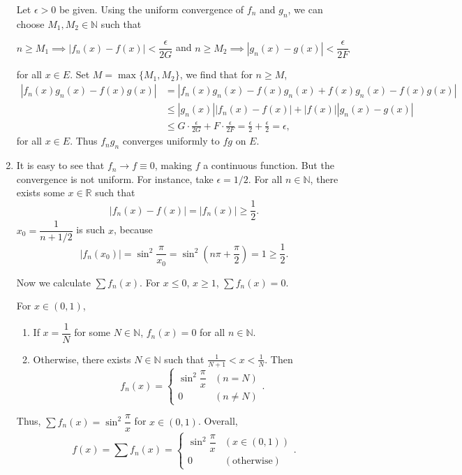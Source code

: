 \documentclass[12pt]{report}
\newcommand{\numl}[1]{\item[\large\textbf{\sffamily #1.}]}
\newcommand{\ds}{\displaystyle}
\newcommand{\abs}[1]{\left| #1 \right|}
\newcommand{\ra}{\rightarrow}
\newcommand{\R}{\mathbb{R}}
\newcommand{\N}{\mathbb{N}}
\begin{document}
\begin{enumerate}
    Let \(\epsilon > 0\) be given. Using the uniform convergence of \(f_n\) and \(g_n\), we can choose \(M_1, M_2 \in \N\) such that
    \begin{center}
        \(n \geq M_1 \implies \abs{f_n(x) - f(x)} < \dfrac{\epsilon}{2G}\) and \(n \geq M_2 \implies \abs{g_n(x) - g(x)} < \dfrac{\epsilon}{2F}\)
    \end{center}
    for all \(x \in E\). Set \(M = \max\{M_1, M_2\}\), we find that for \(n \geq M\),
    \[
        \begin{aligned}
            \abs{f_n(x)g_n(x) - f(x)g(x)} & = \abs{f_n(x)g_n(x) - f(x)g_n(x) + f(x)g_n(x) - f(x)g(x)}                                                            \\
                                          & \leq \abs{g_n(x)}\abs{f_n(x) - f(x)} + \abs{f(x)} \abs{g_n(x) - g(x)}                                                \\
                                          & \leq G \cdot \frac{\epsilon}{2G} + F \cdot \frac{\epsilon}{2F} = \frac{\epsilon}{2} + \frac{\epsilon}{2} = \epsilon,
        \end{aligned}
    \]
    for all \(x \in E\). Thus \(f_ng_n\) converges uniformly to \(fg\) on \(E\).

    \numl{3} It is easy to see that \(f_n \ra f \equiv 0\), making \(f\) a continuous function. But the convergence is not uniform. For instance, take \(\epsilon = 1/2\). For all \(n \in \N\), there exists some \(x\in \R\) such that
    \[
        \abs{f_n(x) - f(x)} = \abs{f_n(x)} \geq \frac{1}{2}.
    \]
    \(x_0 = \dfrac{1}{n + 1/2}\) is such \(x\), because
    \[
        \abs{f_n(x_0)} = \sin^2 \dfrac{\pi}{x_0} = \sin^2 \left(n\pi + \frac{\pi}{2}\right) = 1 \geq \frac{1}{2}.
    \]

    Now we calculate \(\sum f_n(x)\). For \(x \leq 0\), \(x \geq 1\), \(\sum f_n(x) = 0\).

    For \(x \in (0, 1)\),
    \begin{enumerate}
        \item If \(x = \dfrac{1}{N}\) for some \(N \in \N\), \(f_n(x) = 0\) for all \(n \in \N\).
        \item Otherwise, there exists \(N \in \N\) such that \(\ds \frac{1}{N + 1} < x < \frac{1}{N}\). Then
              \[
                  f_n(x) = \begin{cases}
                      \sin^2 \dfrac{\pi}{x} & (n = N)    \\
                      0                     & (n \neq N)
                  \end{cases}.
              \]
    \end{enumerate}
    Thus, \(\sum f_n(x) = \sin^2 \dfrac{\pi}{x}\) for \(x \in (0, 1)\). Overall,
    \[
        f(x) = \sum f_n(x) = \begin{cases}
            \sin^2 \dfrac{\pi}{x} & (x \in (0, 1))     \\
            0                     & (\text{otherwise})
        \end{cases}.
    \]


\end{enumerate}
\end{document}
